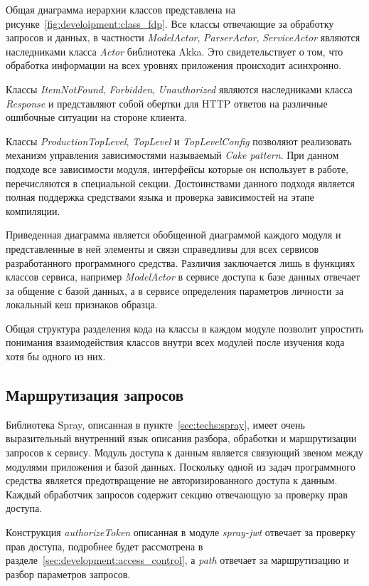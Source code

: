 Общая диаграмма иерархии классов представлена на рисунке~\ref{fig:develoipment:class_fdp}. Все классы отвечающие за обработку запросов и данных, в частности \emph{ModelActor}, \emph{ParserActor}, \emph{ServiceActor} являются наследниками класса \emph{Actor} библиотека Akka. Это свидетельствует о том, что обработка информации на всех уровнях приложения происходит асинхронно.

Классы \emph{ItemNotFound}, \emph{Forbidden}, \emph{Unauthorized} являются наследниками класса \emph{Response} и представляют собой обертки для HTTP ответов на различные ошибочные ситуации на стороне клиента.

Классы \emph{ProductionTopLevel}, \emph{TopLevel} и \emph{TopLevelConfig} позволяют реализовать механизм управления зависимостями называемый \emph{Cake pattern}. При данном подходе все зависимости модуля, интерфейсы которые он использует в работе, перечисляются в специальной секции. Достоинствами данного подходя является полная поддержка средствами языка и проверка зависимостей на этапе компиляции.

Приведенная диаграмма является обобщенной диаграммой каждого модуля и представленные в ней элементы и связи справедливы для всех сервисов разработанного программного средства. Различия заключается лишь в функциях классов сервиса, например \emph{ModelActor} в сервисе доступа к базе данных отвечает за общение с базой данных, а в сервисе определения параметров личности за локальный кеш признаков образца.

Общая структура разделения кода на классы в каждом модуле позволит упростить понимания взаимодействия классов внутри всех модулей после изучения кода хотя бы одного из них.

\subsection{Маршрутизация запросов}
Библиотека Spray, описанная в пункте~\ref{sec:techs:spray}, имеет очень выразительный внутренний язык описания разбора, обработки и маршрутизации запросов к сервису. Модуль доступа к данным является связующий звеном между модулями приложения и базой данных. Поскольку одной из задач программного средства является предотвращение не авторизированного доступа к данным. Каждый обработчик запросов содержит секцию отвечающую за проверку прав доступа.

Конструкция \emph{authorizeToken} описанная в модуле \emph{spray-jwt} отвечает за проверку прав доступа, подробнее будет рассмотрена в разделе~\ref{sec:development:access_control}, а \emph{path} отвечает за маршрутизацию и разбор параметров запросов. 

